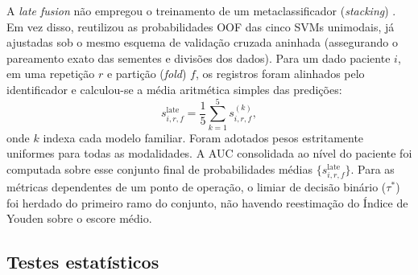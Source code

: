 \documentclass[review]{elsarticle}
\begin{document}
	A \textit{late fusion} não empregou o treinamento de um metaclassificador (\emph{stacking}) \cite{wolpert-1992}. Em vez disso, reutilizou as probabilidades OOF das cinco SVMs unimodais, já ajustadas sob o mesmo esquema de validação cruzada aninhada (assegurando o pareamento exato das sementes e divisões dos dados). Para um dado paciente $i$, em uma repetição $r$ e partição (\emph{fold}) $f$, os registros foram alinhados pelo identificador e calculou-se a média aritmética simples das predições:
	\begin{equation}
		s_{i,r,f}^{\mathrm{late}} = \frac{1}{5}\sum_{k=1}^{5} s_{i,r,f}^{(k)},
		\label{eq:late-mean}
	\end{equation}
	onde $k$ indexa cada modelo familiar. Foram adotados pesos estritamente uniformes para todas as modalidades. A AUC consolidada ao nível do paciente foi computada sobre esse conjunto final de probabilidades médias $\{s_{i,r,f}^{\mathrm{late}}\}$. Para as métricas dependentes de um ponto de operação, o limiar de decisão binário ($\tau^{*}$) foi herdado do primeiro ramo do conjunto, não havendo reestimação do Índice de Youden sobre o escore médio.
	
	\subsection{Testes estatísticos}
	\label{sec:testes}
	
\end{document}
